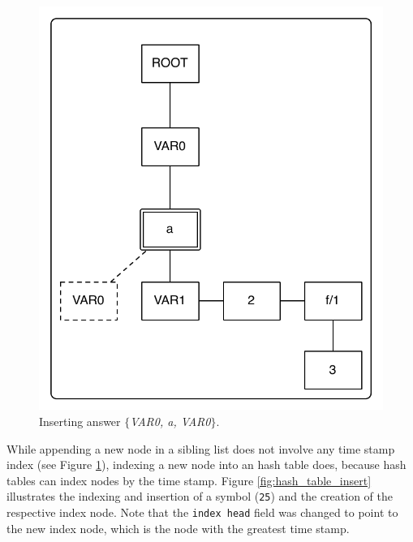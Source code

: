 \begin{figure}[ht]
  \centering
    \includegraphics[scale=0.45]{tst_insert.pdf}
  \caption{Inserting answer $\{$\textit{VAR0, a, VAR0}$\}$.}
  \label{fig:tst_chain_insert}
\end{figure}

While appending a new node in a sibling list does not involve any
time stamp index (see Figure \ref{fig:tst_chain_insert}), indexing a new node into an hash table does,
because hash tables can index nodes by the time stamp. Figure \ref{fig:hash_table_insert}
illustrates the indexing and insertion of a symbol (\texttt{25}) and the creation of the respective
index node. Note that the \texttt{index head} field was changed to point to the new index node, which
is the node with the greatest time stamp.

